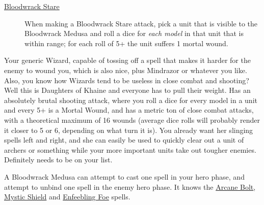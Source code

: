
\begin{description}
    \item [{\hyperref[bloodwrack-stare]{Bloodwrack Stare}}] When making
        a Bloodwrack Stare attack, pick a unit that is visible to the
        Bloodwrack Medusa and roll a dice for \emph{each model} in that unit
        that is within range; for each roll of 5+ the unit suffers 1 mortal
        wound.
\end{description}

Your generic Wizard, capable of tossing off a spell that makes it harder for
the enemy to wound you, which is also nice, plus Mindrazor or whatever you
like. Also, you know how Wizards tend to be useless in close combat and
shooting? Well this is Daughters of Khaine and everyone has to pull their
weight. Has an absolutely brutal shooting attack, where you roll a dice for
every model in a unit and every 5+ is a Mortal Wound, and has a metric ton of
close combat attacks, with a theoretical maximum of 16 wounds (average dice
rolls will probably render it closer to 5 or 6, depending on what turn it is).
You already want her slinging spells left and right, and she can easily be used
to quickly clear out a unit of archers or something while your more important
units take out tougher enemies. Definitely needs to be on your list.

A Bloodwrack Medusa can attempt to cast one spell in your hero phase, and
attempt to unbind one spell in the enemy hero phase. It knows the
\hyperref[arcane-bolt]{Arcane Bolt}, \hyperref[mystic-shield]{Mystic Shield}
and \hyperref[spell:enfeebling-foe]{Enfeebling Foe} spells.\\



